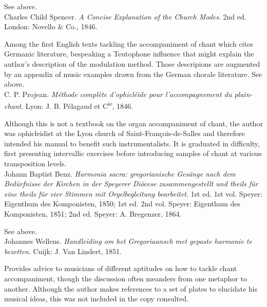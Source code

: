      \parindent=20pt
     \hangindent=20pt
     See  above.\\

    \parindent=0pt
    \hangindent=0pt
  Charles Child Spencer. \emph{A Concise Explanation of the Church Modes}. 2nd ed. London:  Novello \& Co., 1846.

     \parindent=20pt
     \hangindent=20pt
     Among the first English texts tackling the accompaniment of chant which cites Germanic literature, bespeaking a Teutophone influence that might explain the author's description of the modulation method. Those descripions are augmented by an appendix of music examples drawn from the German chorale literature. See  above.\\

    \parindent=0pt
    \hangindent=0pt
  C. P. Projean. \emph{Méthode complète d'ophicléide pour l'accompagnement du plain-chant}. Lyon:  J. B. Pélagaud et C\textsuperscript{ie}, 1846.

     \parindent=20pt
     \hangindent=20pt
     Although this is not a textbook on the organ accompaniment of chant, the author was ophicleidist at the Lyon church of Saint-François-de-Salles and therefore intended his manual to benefit such instrumentalists. It is graduated in difficulty, first presenting intervallic exercises before introducing samples of chant at various transposition levels.\\

    \parindent=0pt
    \hangindent=0pt
  Johann Baptist Benz. \emph{Harmonia sacra: gregorianische Gesänge nach dem Bedürfnisse der Kirchen in der Speyerer Diöcese zusammengestellt und theils für eine theils für vier Stimmen mit Orgelbegleitung bearbeitet}. 1st ed. 1st vol. Speyer:  Eigenthum des Komponisten, 1850;  1st ed. 2nd vol. Speyer:  Eigenthum des Komponisten, 1851;  2nd ed. Speyer:  A. Bregenzer, 1864.

     \parindent=20pt
     \hangindent=20pt
     See  above.\\

    \parindent=0pt
    \hangindent=0pt
  Johannes Wellens. \emph{Handleiding om het Gregoriaansch met gepaste harmonie te bezetten}. Cuijk:  J. Van Lindert, 1851.

     \parindent=20pt
     \hangindent=20pt
     Provides advice to musicians of different aptitudes on how to tackle chant accompaniment, though the discussion often meanders from one metaphor to another. Although the author makes references to a set of plates to elucidate his musical ideas, this was not included in the copy consulted.\\

